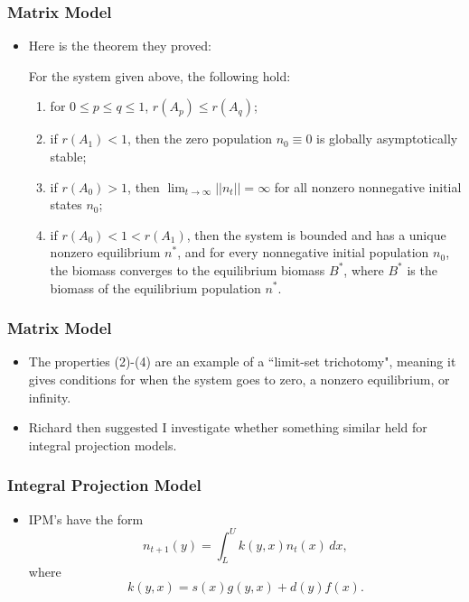 \documentclass{beamer}
\begin{document}
\begin{frame}
	\frametitle{Matrix Model}
	\begin{itemize}
		\pause 
		\item Here is the theorem they proved:
		\pause
		\begin{theorem}
			For the system given above, the following hold:
			\begin{enumerate}
				\pause
				\item for $0 \leq p \leq q \leq 1$, $r(A_p) \leq r(A_q)$;
				\pause
				\item if $r(A_1) < 1$, then the zero population $n_0 \equiv 0$ is globally asymptotically stable;
				\pause
				\item if $r(A_0) > 1$, then $\lim_{t \to \infty} ||n_t|| = \infty$ for all nonzero nonnegative initial states $n_0$;
				\pause
				\item if $r(A_0) < 1 < r(A_1)$, then the system is bounded and has a unique nonzero equilibrium $n^*$, and for every nonnegative initial population $n_0$, the biomass converges to the equilibrium biomass $B^*$, where $B^*$ is the biomass of the equilibrium population $n^*$.
			\end{enumerate}
		\end{theorem}
	\end{itemize}
\end{frame}

\begin{frame}
	\frametitle{Matrix Model}
	\begin{itemize}
		\pause
		\item The properties (2)-(4) are an example of a ``limit-set trichotomy", meaning it gives conditions for when the system goes to zero, a nonzero equilibrium, or infinity.
		\pause
		\item Richard then suggested I investigate whether something similar held for integral projection models.
	\end{itemize}
\end{frame}

\begin{frame}
	\frametitle{Integral Projection Model}
	\begin{itemize}
		\item IPM's have the form
		\[n_{t + 1}(y) = \int_L^U k(y, x) n_t(x) \, dx,\]
		\pause
		where
		\[k(y, x) = s(x) g(y, x) + d(y) f(x).\]

	\end{itemize}
\end{frame}
\end{document}
